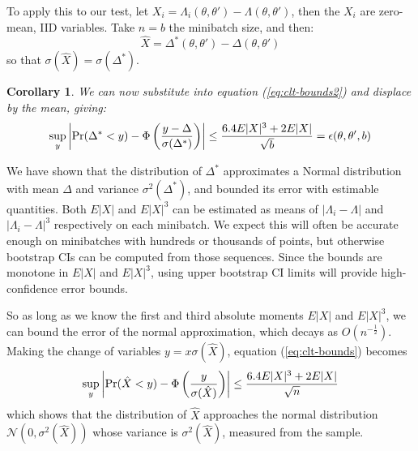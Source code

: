 \documentclass{article}
\newtheorem{corollary}{Corollary}
\begin{document}
To apply this to our test, let $X_i = \Lambda_i(\theta,\theta') - \Lambda(\theta,\theta')$,
then the $X_i$ are zero-mean, IID variables.
Take $n=b$ the minibatch size, and then:
\begin{equation}
\hat{X} = \Delta^*(\theta,\theta') - \Delta(\theta,\theta') 
\end{equation}
so that $\sigma(\hat{X}) = \sigma(\Delta^*)$.
\begin{corollary}
  We can now substitute into equation (\ref{eq:clt-bounds2}) and displace by the mean, giving:
\begin{equation}\label{eq:clt-bounds3}
   \sup_y\left|{\rm Pr}(\Delta^*< y) - \Phi\left(\frac{y-\Delta}{\sigma(\Delta^*)}\right)\right| \leq \frac{6.4E|X|^3+2E|X|}{\sqrt{b}} = \epsilon(\theta,\theta',b)
\end{equation}
\end{corollary}

We have shown that the distribution of $\Delta^*$ approximates a
Normal distribution with mean $\Delta$ and variance
$\sigma^2(\Delta^*)$, and bounded its error with estimable
quantities. Both $E|X|$ and $E|X|^3$ can be estimated as means of
$|\Lambda_i - \Lambda|$ and $|\Lambda_i - \Lambda|^3$ respectively on each minibatch. We expect this
will often be accurate enough on minibatches with hundreds or
thousands of points, but otherwise bootstrap CIs can be computed from
those sequences. Since the bounds are monotone in $E|X|$ and $E|X|^3$,
using upper bootstrap CI limits will provide high-confidence error bounds.

So as long as we know the first and third absolute moments $E|X|$ and $E|X|^3$, we can bound the
error of the normal approximation, which decays as $O(n^{-\frac{1}{2}})$. Making the change of variables
$y = x \sigma(\hat{X})$, equation (\ref{eq:clt-bounds}) becomes
\begin{equation}\label{eq:clt-bounds2}
   \sup_y\left|{\rm Pr}(\hat{X}< y) - \Phi\left(\frac{y}{\sigma(\hat{X})}\right)\right| \leq \frac{6.4E|X|^3+2E|X|}{\sqrt{n}}
\end{equation}
which shows that the distribution of $\hat{X}$ approaches the normal distribution $\mathcal{N}(0,\sigma^2(\hat{X}))$
whose variance is $\sigma^2(\hat{X})$, measured from the sample.
\end{document}
